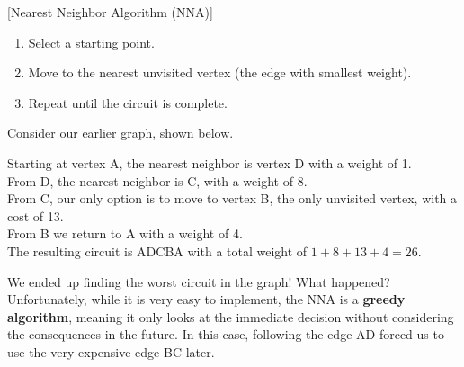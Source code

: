 \begin{algorithm}{}{}[Nearest Neighbor Algorithm (NNA)]
\hspace{3in}
\begin{enumerate}
\item	Select a starting point.
\item	Move to the nearest unvisited vertex (the edge with smallest weight).
\item	Repeat until the circuit is complete.
\end{enumerate}
\end{algorithm}

\begin{example}\label{graph17_ex} %
Consider our earlier graph, shown below.  

\begin{center}
\end{center}
\noindent Starting at vertex A, the nearest neighbor is vertex D with a weight of 1.\\
From D, the nearest neighbor is C, with a weight of 8.  \\
From C, our only option is to move to vertex B, the only unvisited vertex, with a cost of 13.  \\
From B we return to A with a weight of 4.  \\

\noindent The resulting circuit is ADCBA with a total weight of $1+8+13+4 = 26$.
\end{example}

We ended up finding the worst circuit in the graph!  What happened?  Unfortunately, while it is very easy to implement, the NNA is a \textbf{greedy algorithm}, meaning it only looks at the immediate decision without considering the consequences in the future.  In this case, following the edge AD forced us to use the very expensive edge BC later.


